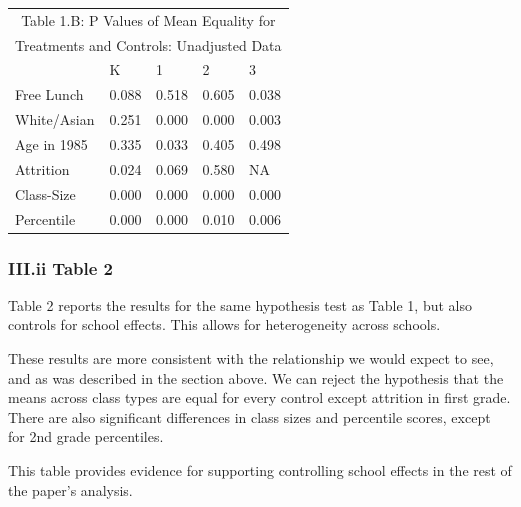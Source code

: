 \documentclass[a4paper,11pt]{article}
\begin{document}
\begin{table}[H]
\begin{center}	
	\begin{tabular}{ l | l  l  l  l } 
	\multicolumn{5}{c}{Table 1.B: P Values of Mean Equality for} \\
	\multicolumn{5}{c}{Treatments and Controls: Unadjusted Data} \\ \hline \hline
	& K  & 1  & 2  & 3  \\  \hline 
	Free Lunch & 0.088 & 0.518 & 0.605 & 0.038 \\  
	White/Asian & 0.251 & 0.000 & 0.000 & 0.003 \\  
	Age in 1985 & 0.335 & 0.033 & 0.405 & 0.498 \\  
	Attrition & 0.024 & 0.069 & 0.580 & NA \\  
	Class-Size & 0.000 & 0.000 & 0.000 & 0.000 \\  
	Percentile & 0.000 & 0.000 & 0.010 & 0.006 \\  
\hline \hline
\end{tabular}
\end{center}
\end{table}


\subsubsection*{III.ii Table 2}
Table 2 reports the results for the same hypothesis test as Table 1, but also controls for school effects. This allows for heterogeneity across schools. \par
These results are more consistent with the relationship we would expect to see, and as was described in the section above. We can reject the hypothesis that the means across class types are equal for every control except attrition in first grade. There are also significant differences in class sizes and percentile scores, except for 2nd grade percentiles.  \par
This table provides evidence for supporting controlling school effects in the rest of the paper's analysis. \par
\end{document}
